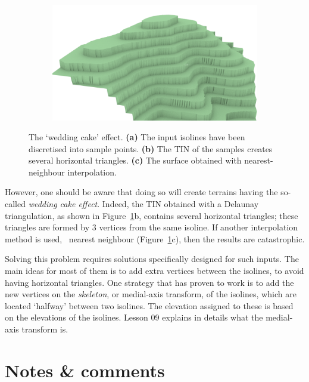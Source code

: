 \begin{figure}
\begin{subfigure}[b]{0.38\linewidth}
    \caption{}
  \end{subfigure}
  \begin{subfigure}[b]{0.38\linewidth}
    \centering
    \includegraphics[width=\textwidth]{figs/wedding-nn.png}
    \caption{}
  \end{subfigure}  
\caption{The `wedding cake' effect. \textbf{(a)} The input isolines have been discretised into sample points. \textbf{(b)} The TIN of the samples creates several horizontal triangles. \textbf{(c)} The surface obtained with nearest-neighbour interpolation.}%
\label{fig:wedding}
\end{figure}
However, one should be aware that doing so will create terrains having the so-called \emph{wedding cake effect}.
Indeed, the TIN obtained with a Delaunay triangulation, as shown in Figure~\ref{fig:wedding}b, contains several horizontal triangles; these triangles are formed by 3 vertices from the same isoline.
If another interpolation method is used, \eg\ nearest neighbour (Figure~\ref{fig:wedding}c), then the results are catastrophic.

%

Solving this problem requires solutions specifically designed for such inputs.
The main ideas for most of them is to add extra vertices between the isolines, to avoid having horizontal triangles. 
One strategy that has proven to work is to add the new vertices on the \emph{skeleton}, or medial-axis transform, of the isolines, which are located `halfway' between two isolines.
The elevation assigned to these is based on the elevations of the isolines.
Lesson 09 explains in details what the medial-axis transform is.



%
\section{Notes \& comments}

